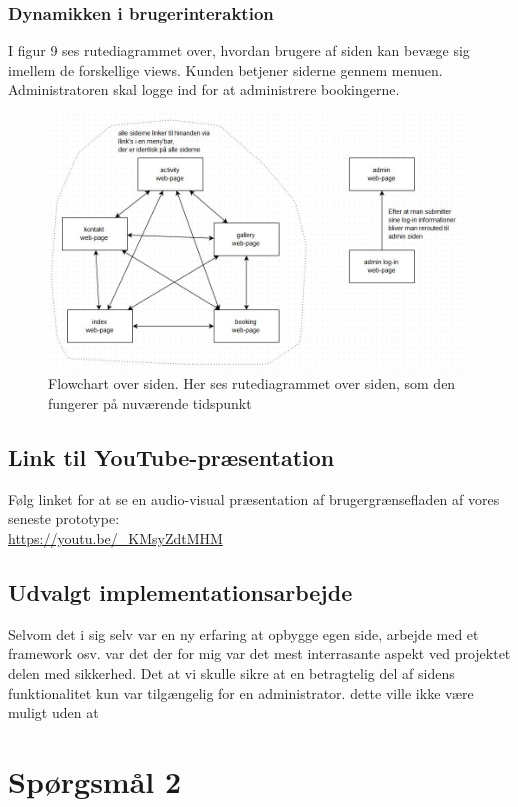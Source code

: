 \documentclass[12pt,a4paper]{article}
\begin{document}
\subsubsection{Dynamikken i brugerinteraktion}
I figur 9 ses rutediagrammet over, 
hvordan brugere af siden kan bevæge sig imellem de forskellige views. 
Kunden betjener siderne gennem menuen.
Administratoren skal logge ind for at administrere bookingerne.
\begin{figure}[H]
\centering
\includegraphics[scale=0.6] {flowchart.jpg}
\caption{Flowchart over siden. Her ses rutediagrammet over siden, som den fungerer på nuværende tidspunkt}
\end{figure}
\subsection{Link til YouTube-præsentation}
Følg linket for at se en audio-visual præsentation af brugergrænsefladen af vores seneste prototype: \\

\url{https://youtu.be/_KMsyZdtMHM}
\subsection{Udvalgt implementationsarbejde}
Selvom det i sig selv var en ny erfaring at opbygge egen side, arbejde med et framework osv. var det der for mig var det mest interrasante aspekt ved projektet delen med sikkerhed. Det at vi skulle sikre at en betragtelig del af sidens funktionalitet kun var tilgængelig for en administrator. dette ville ikke være muligt uden at 
\section{Spørgsmål 2}
\end{document}

